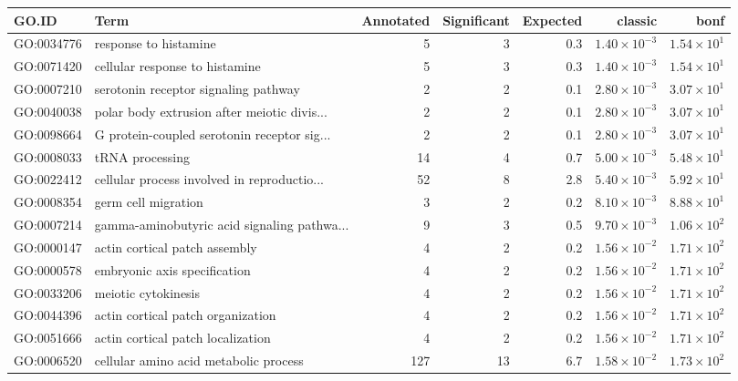 \begin{table}[ht]
\centering
\begin{adjustbox}{max width=\textwidth}
\begin{tabular}{llrrrrr}
  \hline
GO.ID & Term & Annotated & Significant & Expected & classic & bonf \\ 
  \hline
GO:0034776 & response to histamine & 5 & 3 & 0.3 & $1.40 \times 10^{-3}$ & $1.54 \times 10^{1}$ \\ 
  GO:0071420 & cellular response to histamine & 5 & 3 & 0.3 & $1.40 \times 10^{-3}$ & $1.54 \times 10^{1}$ \\ 
  GO:0007210 & serotonin receptor signaling pathway & 2 & 2 & 0.1 & $2.80 \times 10^{-3}$ & $3.07 \times 10^{1}$ \\ 
  GO:0040038 & polar body extrusion after meiotic divis... & 2 & 2 & 0.1 & $2.80 \times 10^{-3}$ & $3.07 \times 10^{1}$ \\ 
  GO:0098664 & G protein-coupled serotonin receptor sig... & 2 & 2 & 0.1 & $2.80 \times 10^{-3}$ & $3.07 \times 10^{1}$ \\ 
  GO:0008033 & tRNA processing & 14 & 4 & 0.7 & $5.00 \times 10^{-3}$ & $5.48 \times 10^{1}$ \\ 
  GO:0022412 & cellular process involved in reproductio... & 52 & 8 & 2.8 & $5.40 \times 10^{-3}$ & $5.92 \times 10^{1}$ \\ 
  GO:0008354 & germ cell migration & 3 & 2 & 0.2 & $8.10 \times 10^{-3}$ & $8.88 \times 10^{1}$ \\ 
  GO:0007214 & gamma-aminobutyric acid signaling pathwa... & 9 & 3 & 0.5 & $9.70 \times 10^{-3}$ & $1.06 \times 10^{2}$ \\ 
  GO:0000147 & actin cortical patch assembly & 4 & 2 & 0.2 & $1.56 \times 10^{-2}$ & $1.71 \times 10^{2}$ \\ 
  GO:0000578 & embryonic axis specification & 4 & 2 & 0.2 & $1.56 \times 10^{-2}$ & $1.71 \times 10^{2}$ \\ 
  GO:0033206 & meiotic cytokinesis & 4 & 2 & 0.2 & $1.56 \times 10^{-2}$ & $1.71 \times 10^{2}$ \\ 
  GO:0044396 & actin cortical patch organization & 4 & 2 & 0.2 & $1.56 \times 10^{-2}$ & $1.71 \times 10^{2}$ \\ 
  GO:0051666 & actin cortical patch localization & 4 & 2 & 0.2 & $1.56 \times 10^{-2}$ & $1.71 \times 10^{2}$ \\ 
  GO:0006520 & cellular amino acid metabolic process & 127 & 13 & 6.7 & $1.58 \times 10^{-2}$ & $1.73 \times 10^{2}$ \\ 

\end{tabular}
\end{adjustbox}
\end{table}
